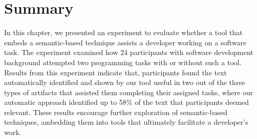 \section{Summary}
\label{cp6:summary}



In this chapter, we presented an experiment to evaluate whether a tool that embeds a semantic-based technique assists a developer working on a software task. 
The experiment examined how 24 participants with software development background attempted 
two programming tasks with or without such a tool. 
Results from this experiment indicate that, 
participants found the text automatically identified and shown by our tool useful in two 
out of the three types of artifacts that assisted them completing their assigned tasks,
where our automatic approach identified up to 58\% of the text that participants deemed relevant. 
These results encourage further exploration of semantic-based techniques, 
ambedding them into tools that ultimately facilitate a developer's work.